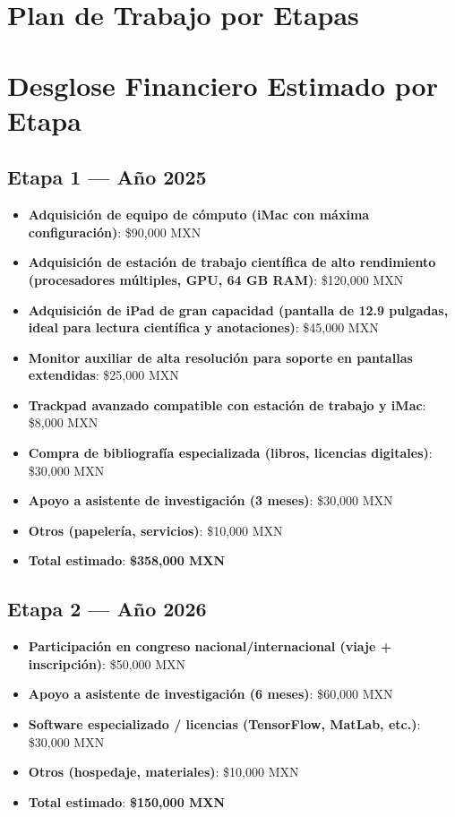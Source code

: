 \documentclass[12pt]{article}
\begin{document}
\section{Plan de Trabajo por Etapas}


\section{Desglose Financiero Estimado por Etapa}

\subsection*{Etapa 1 — Año 2025}
\begin{itemize}
  \item \textbf{Adquisición de equipo de cómputo (iMac con máxima configuración)}: \$90,000 MXN
  \item \textbf{Adquisición de estación de trabajo científica de alto rendimiento (procesadores múltiples, GPU, 64 GB RAM)}: \$120,000 MXN
  \item \textbf{Adquisición de iPad de gran capacidad (pantalla de 12.9 pulgadas, ideal para lectura científica y anotaciones)}: \$45,000 MXN
  \item \textbf{Monitor auxiliar de alta resolución para soporte en pantallas extendidas}: \$25,000 MXN
  \item \textbf{Trackpad avanzado compatible con estación de trabajo y iMac}: \$8,000 MXN
  \item \textbf{Compra de bibliografía especializada (libros, licencias digitales)}: \$30,000 MXN
  \item \textbf{Apoyo a asistente de investigación (3 meses)}: \$30,000 MXN
  \item \textbf{Otros (papelería, servicios)}: \$10,000 MXN
  \item \textbf{Total estimado}: \textbf{\$358,000 MXN}
\end{itemize}

\subsection*{Etapa 2 — Año 2026}
\begin{itemize}
  \item \textbf{Participación en congreso nacional/internacional (viaje + inscripción)}: \$50,000 MXN
  \item \textbf{Apoyo a asistente de investigación (6 meses)}: \$60,000 MXN
  \item \textbf{Software especializado / licencias (TensorFlow, MatLab, etc.)}: \$30,000 MXN
  \item \textbf{Otros (hospedaje, materiales)}: \$10,000 MXN
  \item \textbf{Total estimado}: \textbf{\$150,000 MXN}
\end{itemize}
\end{document}
